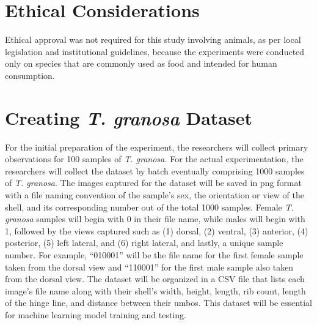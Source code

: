 \section{Ethical Considerations}
Ethical approval was not required for this study involving animals, as per local legislation and institutional guidelines, because the experiments were conducted only on species that are commonly used as food and intended for human consumption. 


\section{Creating \textit{T. granosa} Dataset}
For the initial preparation of the experiment, the researchers will collect primary observations for 100 samples of \textit{T. granosa.} For the actual experimentation, the researchers will collect the dataset by batch eventually comprising 1000 samples of \textit{T. granosa}. The images captured for the dataset will be saved in png format with a file naming convention of the sample’s sex, the orientation or view of the shell, and its corresponding number out of the total 1000 samples. Female \textit{T. granosa} samples will begin with 0 in their file name, while males will begin with 1, followed by the views captured such as (1) dorsal, (2) ventral, (3) anterior, (4) posterior, (5) left lateral, and (6) right lateral, and lastly, a unique sample number. For example, “010001” will be the file name for the first female sample taken from the dorsal view and “110001” for the first male sample also taken from the dorsal view. The dataset will be organized in a CSV file that lists each image’s file name along with their shell’s width, height, length, rib count, length of the hinge line, and distance between their umbos. This dataset will be essential for machine learning model training and testing. 

